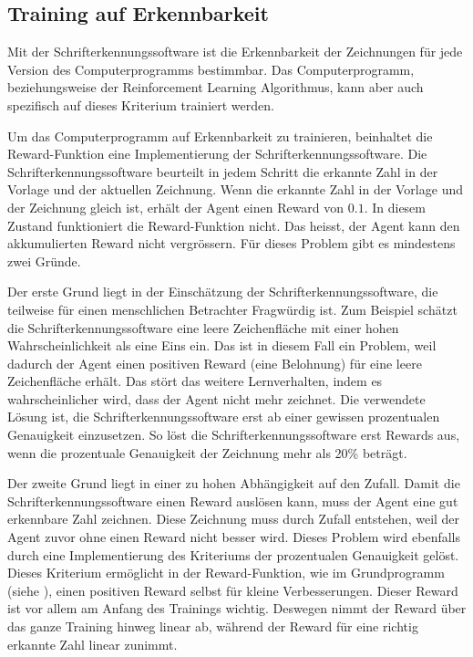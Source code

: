 \subsection{Training auf Erkennbarkeit}
Mit der Schrifterkennungssoftware ist die Erkennbarkeit der Zeichnungen für jede
Version des Computerprogramms bestimmbar. Das Computerprogramm, beziehungsweise
der Reinforcement Learning Algorithmus, kann aber auch spezifisch auf dieses
Kriterium trainiert werden. 

Um das Computerprogramm auf Erkennbarkeit zu trainieren, beinhaltet die
Reward-Funktion eine Implementierung der Schrifterkennungssoftware. Die
Schrifterkennungssoftware beurteilt in jedem Schritt die erkannte Zahl in der
Vorlage und der aktuellen Zeichnung. Wenn die erkannte Zahl in der Vorlage und
der Zeichnung gleich ist, erhält der Agent einen Reward von $0.1$. In diesem
Zustand funktioniert die Reward-Funktion nicht. Das heisst, der Agent kann den
akkumulierten Reward nicht vergrössern. Für dieses Problem gibt es mindestens
zwei Gründe.

Der erste Grund liegt in der Einschätzung der Schrifterkennungssoftware, die
teilweise für einen menschlichen Betrachter Fragwürdig ist. Zum Beispiel schätzt
die Schrifterkennungssoftware eine leere Zeichenfläche mit einer hohen
Wahrscheinlichkeit als eine Eins ein. Das ist in diesem Fall ein Problem, weil
dadurch der Agent einen positiven Reward (eine Belohnung) für eine leere
Zeichenfläche erhält. Das stört das weitere Lernverhalten, indem es
wahrscheinlicher wird, dass der Agent nicht mehr zeichnet. Die verwendete Lösung
ist, die Schrifterkennungssoftware erst ab einer gewissen prozentualen
Genauigkeit einzusetzen. So löst die Schrifterkennungssoftware erst Rewards aus,
wenn die prozentuale Genauigkeit der Zeichnung mehr als 20\% beträgt.

Der zweite Grund liegt in einer zu hohen Abhängigkeit auf den Zufall. Damit die
Schrifterkennungssoftware einen Reward auslösen kann, muss der Agent eine gut
erkennbare Zahl zeichnen. Diese Zeichnung muss durch Zufall entstehen, weil der
Agent zuvor ohne einen Reward nicht besser wird. Dieses Problem wird ebenfalls
durch eine Implementierung des Kriteriums der prozentualen Genauigkeit gelöst.
Dieses Kriterium ermöglicht in der Reward-Funktion, wie im Grundprogramm (siehe
), einen positiven Reward selbst für kleine
Verbesserungen. Dieser Reward ist vor allem am Anfang des Trainings wichtig.
Deswegen nimmt der Reward über das ganze Training hinweg linear ab, während der
Reward für eine richtig erkannte Zahl linear zunimmt.


